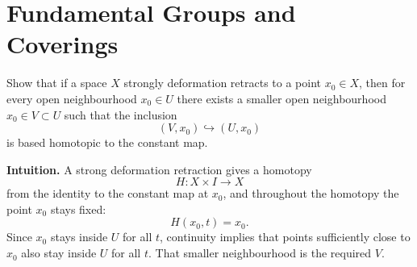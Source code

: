 \section{Fundamental Groups and Coverings}

\begin{problem}
Show that if a space \(X\) strongly deformation retracts to a point \(x_0 \in X\), then for every open neighbourhood \(x_0 \in U\) there exists a smaller open neighbourhood \(x_0 \in V \subset U\) such that the inclusion
\[
(V,x_0)\hookrightarrow (U,x_0)
\]
is based homotopic to the constant map.

\par

\textbf{Intuition.}
A strong deformation retraction gives a homotopy
\[
H:X\times I\to X
\]
from the identity to the constant map at \(x_0\), and throughout the homotopy the point \(x_0\) stays fixed:
\[
H(x_0,t)=x_0.
\]
Since \(x_0\) stays inside \(U\) for all \(t\), continuity implies that points sufficiently close to \(x_0\) also stay inside \(U\) for all \(t\). That smaller neighbourhood is the required \(V\).

\par
\end{problem}


